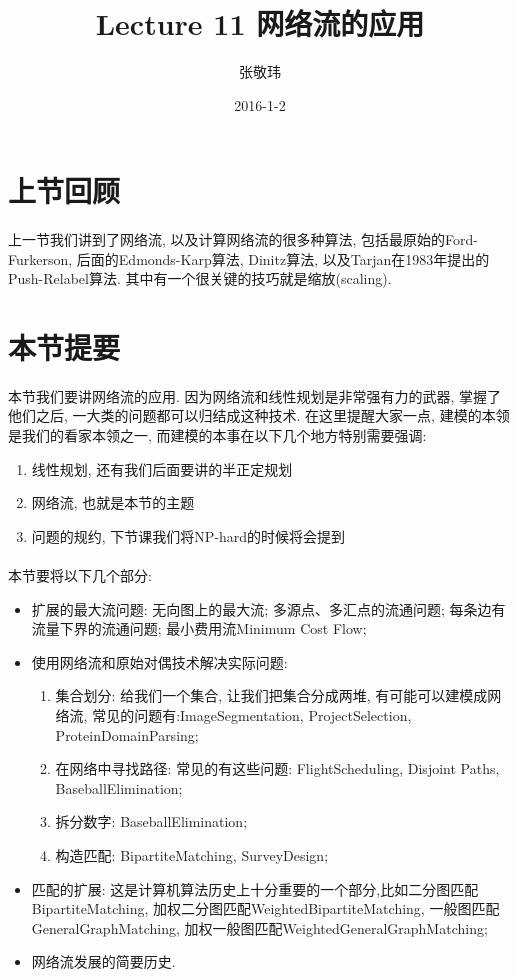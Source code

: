\documentclass[a4paper]{article}
\title{Lecture 11 网络流的应用}
\date{2016-1-2}
\author{张敬玮}
\begin{document}
    \maketitle
    \section{上节回顾}
        \paragraph{}上一节我们讲到了网络流, 以及计算网络流的很多种算法, 包括最原始的Ford-Furkerson, 后面的Edmonds-Karp算法, Dinitz算法, 以及Tarjan在1983年提出的Push-Relabel算法. 其中有一个很关键的技巧就是缩放(scaling). 
    \section{本节提要}
        \paragraph{}本节我们要讲网络流的应用. 因为网络流和线性规划是非常强有力的武器, 掌握了他们之后, 一大类的问题都可以归结成这种技术. 在这里提醒大家一点, 建模的本领是我们的看家本领之一, 而建模的本事在以下几个地方特别需要强调: 
        \begin{enumerate}
        \item 线性规划, 还有我们后面要讲的半正定规划
        \item 网络流, 也就是本节的主题
        \item 问题的规约, 下节课我们将NP-hard的时候将会提到
        \end{enumerate}
        \paragraph{}本节要将以下几个部分:
        \begin{itemize}
        \item 扩展的最大流问题: 无向图上的最大流; 多源点、多汇点的流通问题;  每条边有流量下界的流通问题; 最小费用流{\sc Minimum Cost Flow};
        \item 使用网络流和原始对偶技术解决实际问题:
            \begin{enumerate}
            \item 集合划分: 给我们一个集合, 让我们把集合分成两堆, 有可能可以建模成网络流, 常见的问题有:{\sc ImageSegmentation}, {\sc ProjectSelection}, {\sc ProteinDomainParsing};
            \item 在网络中寻找路径: 常见的有这些问题: {\sc FlightScheduling}, {\sc Disjoint Paths}, {\sc BaseballElimination};
            \item 拆分数字: {\sc BaseballElimination};
\item 构造匹配: {\sc BipartiteMatching}, {\sc SurveyDesign};
            \end{enumerate}
        \item 匹配的扩展: 这是计算机算法历史上十分重要的一个部分,比如二分图匹配{\sc BipartiteMatching}, 加权二分图匹配{\sc WeightedBipartiteMatching}, 一般图匹配{\sc GeneralGraphMatching}, 加权一般图匹配{\sc WeightedGeneralGraphMatching};
        \item 网络流发展的简要历史.
        \end{itemize}
\end{document}
